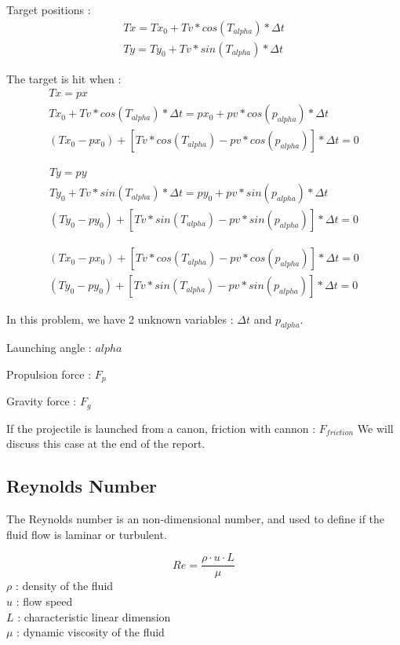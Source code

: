 \documentclass[12pt,a4paper]{article}
\begin{document}
Target positions : 
\begin{eqnarray}
	Tx = Tx_0 + Tv * cos(T_{alpha}) * \Delta t\\
	Ty = Ty_0 + Tv * sin(T_{alpha}) * \Delta t
\end{eqnarray}

The target is hit when :
\begin{eqnarray}
	Tx = px\\
	Tx_0 + Tv * cos(T_{alpha}) * \Delta t = px_0 + pv * cos(p_{alpha}) * \Delta t\\
	(Tx_0 - px_0) + [Tv * cos(T_{alpha})-pv * cos(p_{alpha}) ] * \Delta t =  0
\end{eqnarray}

\begin{eqnarray}
	Ty = py \\
	Ty_0 + Tv * sin(T_{alpha}) * \Delta t = py_0 + pv * sin(p_{alpha}) * \Delta t\\
	(Ty_0 -py_0) + [Tv * sin(T_{alpha}) - pv * sin(p_{alpha})] * \Delta t = 0
\end{eqnarray}


\begin{eqnarray}
	(Tx_0 - px_0) + [Tv * cos(T_{alpha})-pv * cos(p_{alpha}) ] * \Delta t =  0 \\
	(Ty_0 -py_0) + [Tv * sin(T_{alpha}) - pv * sin(p_{alpha})] * \Delta t = 0
\end{eqnarray}

In this problem, we have 2 unknown variables : $\Delta t$ and $p_{alpha}$.


Launching angle : $alpha$

Propulsion force : $F_p$

Gravity force : $F_g$

If the projectile is launched from a canon, 
friction with cannon : $F_{friction}$
We will discuss this case at the end of the report. 

\subsection{Reynolds Number}
The Reynolds number is an non-dimensional number, and used to define if the fluid flow is laminar or turbulent. 

\begin{equation}
	Re = \frac{\rho \cdot u \cdot L}{\mu}
\end{equation}
$\rho$ : density of the fluid\\
$u$ : flow speed\\
$L$ : characteristic linear dimension\\
$\mu$ : dynamic viscosity of the fluid\\
\end{document}
